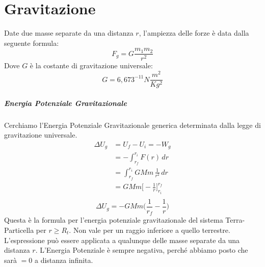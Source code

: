 \chapter{Gravitazione}

Date due masse separate da una distanza $r$, l'ampiezza delle forze è data 
dalla seguente formula:
\begin{equation}
    F_g = G\frac{m_1m_2}{r^2}
\end{equation}
Dove $G$ è la costante di gravitazione universale:
\begin{equation*}
    G = 6,673^{-11} N\frac{m^2}{Kg^2}
\end{equation*}
    
    \paragraph{Energia Potenziale Gravitazionale} Cerchiamo l'Energia 
    Potenziale Gravitazionale generica determinata dalla legge di gravitazione 
    universale.
    \begin{align*}
        \Delta U_g &= U_f - U_i = -W_g \\
        &= - \int_{r_f}^{r_i} F(r) \,dr \\
        &= \int_{r_f}^{r_i} GMm \, \frac{1}{r^2} \,dr \\
        &= GMm \bigg[-\frac{1}{r}\bigg]^{r_f}_{r_i} \\
    \end{align*}
    \begin{equation}
        \Delta U_g = -GMm\biggl(\frac{1}{r_f} - \frac{1}{r}\biggr)
    \end{equation}
    Questa è la formula per l'energia potenziale gravitazionale del sistema
    Terra-Particella per $r \geq R_t$. Non vale per un raggio inferiore a
    quello terrestre.
    L'espressione può essere applicata a qualunque delle masse separate da una
    distanza $r$. L'Energia Potenziale è sempre negativa, perché abbiamo posto
    che sarà $= 0$ a distanza infinita.
